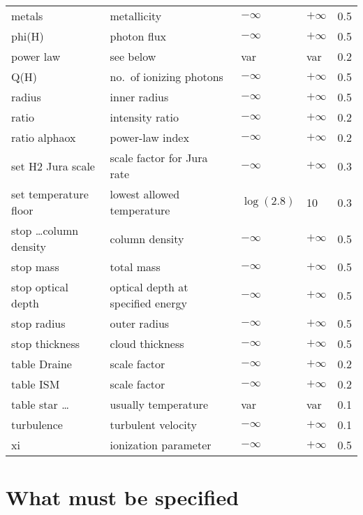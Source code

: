 \begin{table}
\begin{tabular}{lllll}
metals& metallicity& $-\infty$& $+\infty$& 0.5\\
phi(H)& photon flux& $-\infty$& $+\infty$& 0.5\\
power law& see below& var& var& 0.2\\
Q(H)& no.\ of ionizing photons& $-\infty$& $+\infty$& 0.5\\
radius& inner radius& $-\infty$& $+\infty$& 0.5\\
ratio& intensity ratio& $-\infty$& $+\infty$& 0.2\\
ratio alphaox& power-law index& $-\infty$& $+\infty$& 0.2\\
set H2 Jura scale& scale factor for Jura rate& $-\infty$& $+\infty$& 0.3\\
set temperature floor& lowest allowed temperature& $\log(2.8)$& 10& 0.3\\
stop \ldots column density& column density& $-\infty$& $+\infty$& 0.5\\
stop mass & total mass& $-\infty$& $+\infty$& 0.5\\
stop optical depth& optical depth at specified energy & $-\infty$& $+\infty$& 0.5\\
stop radius& outer radius& $-\infty$& $+\infty$& 0.5\\
stop thickness& cloud thickness& $-\infty$& $+\infty$& 0.5\\
table Draine& scale factor& $-\infty$& $+\infty$& 0.2\\
table ISM& scale factor& $-\infty$& $+\infty$& 0.2\\
table star \ldots& usually temperature& var& var& 0.1\\
turbulence& turbulent velocity& $-\infty$& $+\infty$& 0.1\\
xi& ionization parameter& $-\infty$& $+\infty$& 0.5\\
\hline
\end{tabular}
\end{table}

\section{What must be specified}


